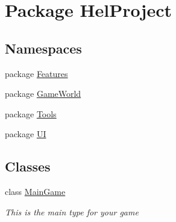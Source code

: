 \hypertarget{namespace_hel_project}{}\section{Package Hel\+Project}
\label{namespace_hel_project}
\subsection*{Namespaces}
\begin{DoxyCompactItemize}
\item 
package \hyperlink{namespace_hel_project_1_1_features}{Features}
\item 
package \hyperlink{namespace_hel_project_1_1_game_world}{Game\+World}
\item 
package \hyperlink{namespace_hel_project_1_1_tools}{Tools}
\item 
package \hyperlink{namespace_hel_project_1_1_u_i}{U\+I}
\end{DoxyCompactItemize}
\subsection*{Classes}
\begin{DoxyCompactItemize}
\item 
class \hyperlink{class_hel_project_1_1_main_game}{Main\+Game}
\begin{DoxyCompactList}\small\item\em This is the main type for your game \end{DoxyCompactList}\end{DoxyCompactItemize}
